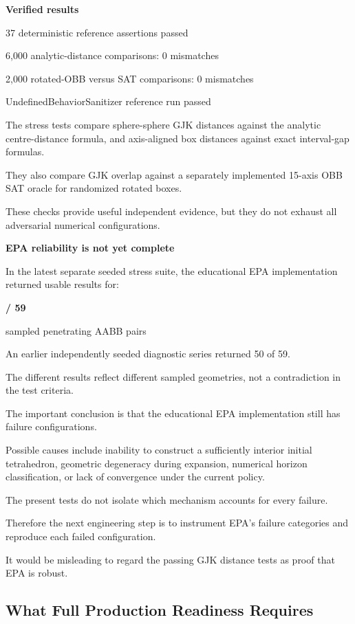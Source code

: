 \textbf{Verified results}

37 deterministic reference assertions passed

6,000 analytic-distance comparisons: 0 mismatches

2,000 rotated-OBB versus SAT comparisons: 0 mismatches

UndefinedBehaviorSanitizer reference run passed

The stress tests compare sphere-sphere GJK distances against the analytic centre-distance formula, and axis-aligned box distances against exact interval-gap formulas.

They also compare GJK overlap against a separately implemented 15-axis OBB SAT oracle for randomized rotated boxes.

These checks provide useful independent evidence, but they do not exhaust all adversarial numerical configurations.

\textbf{EPA reliability is not yet complete}

In the latest separate seeded stress suite, the educational EPA implementation returned usable results for:

\textbf{/ 59}

sampled penetrating AABB pairs

An earlier independently seeded diagnostic series returned 50 of 59.

The different results reflect different sampled geometries, not a contradiction in the test criteria.

The important conclusion is that the educational EPA implementation still has failure configurations.

Possible causes include inability to construct a sufficiently interior initial tetrahedron, geometric degeneracy during expansion, numerical horizon classification, or lack of convergence under the current policy.

The present tests do not isolate which mechanism accounts for every failure.

Therefore the next engineering step is to instrument EPA's failure categories and reproduce each failed configuration.

It would be misleading to regard the passing GJK distance tests as proof that EPA is robust.

\subsection{What Full Production Readiness Requires}\label{04-visual-computing-ii-ch026-what-full-production-readiness-requires}

